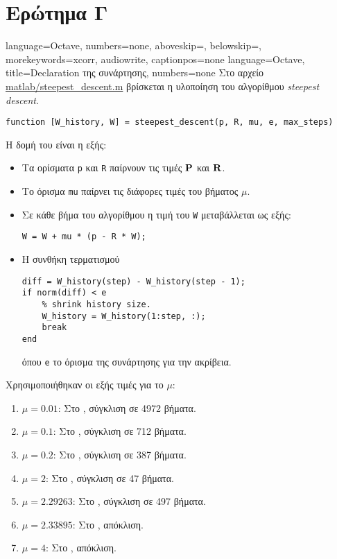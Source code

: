 \section{Ερώτημα Γ}
\newcommand{\plothere}[2]{%
\begin{figure}[htbp]%
\centering%
\texttt{[image: plots/\#1]}%
\caption{#2}
\label{fig:#1}%
\end{figure}%
}
{language=Octave,
numbers=none,
aboveskip=\smallskipamount,
belowskip=\smallskipamount,
morekeywords={xcorr, audiowrite}, %
captionpos=none
}
{language=Octave,
title={Declaration της συνάρτησης},
numbers=none
}
Στο αρχείο \url{matlab/steepest_descent.m} βρίσκεται η υλοποίηση του αλγορίθμου \textit{steepest descent}.
\begin{lstlisting}[style=declaration]
function [W_history, W] = steepest_descent(p, R, mu, e, max_steps)
\end{lstlisting}
Η δομή του είναι η εξής:
\begin{itemize}
\item Τα ορίσματα \lstinline!p! και \lstinline!R! παίρνουν τις τιμές $\mathbf{P}$ και $\mathbf{R}$.
\item Το όρισμα \lstinline!mu! παίρνει τις διάφορες τιμές του βήματος $\mu$.
\item Σε κάθε βήμα του αλγορίθμου η τιμή του \lstinline!W! μεταβάλλεται ως εξής:
\begin{lstlisting}[style=chunk]
W = W + mu * (p - R * W);
\end{lstlisting}
\item Η συνθήκη τερματισμού 
\begin{lstlisting}[style=chunk]
diff = W_history(step) - W_history(step - 1);
if norm(diff) < e
    % shrink history size.
    W_history = W_history(1:step, :);
    break
end
\end{lstlisting}
όπου \lstinline!e! το όρισμα της συνάρτησης για την ακρίβεια.
\end{itemize}

Χρησιμοποιήθηκαν οι εξής τιμές για το $\mu$:
\begin{enumerate}
\item $\mu=0.01$: Στο , σύγκλιση σε 4972 βήματα.
\item $\mu=0.1$: Στο , σύγκλιση σε 712 βήματα.
\item $\mu=0.2$: Στο , σύγκλιση σε 387 βήματα.
\item $\mu=2$: Στο , σύγκλιση σε 47 βήματα.
\item $\mu=2.29263$: Στο , σύγκλιση σε 497 βήματα.
\item $\mu=2.33895$: Στο , απόκλιση.
\item $\mu=4$: Στο , απόκλιση.
\end{enumerate}

